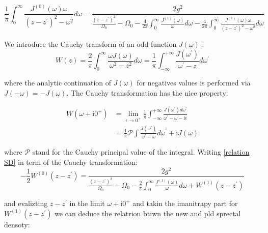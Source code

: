 \documentclass[%
preprint,
onecolumn,
notitlepag,
 amsmath,amssymb,
 aps,
 pra,
]{revtex4-2}
\begin{document}
\begin{itemize}
\begin{equation}
\frac{1}{\pi} \int_{0}^{\infty} \frac{J^{(0)}(\omega) \omega}{\left(z-z^{\prime}\right)^{2}-\omega^{2}} d \omega=\frac{2 g^{2}}{\frac{\left(z-z^{\prime}\right)^{2}}{\Omega_{0}}-\Omega_{0}-\frac{4}{2 \pi} \int_{0}^{\infty} \frac{J^{(1)}(\omega)}{\omega} d \omega-\frac{4}{2 \pi} \int_{0}^{\infty} \frac{J^{(1)}(\omega) \omega}{\left(z-z^{\prime}\right)^{2}-\omega^{2}} d \omega}
\label{relation SD}
\end{equation}

We introduce the Cauchy transform of an odd function $J(\omega)$ :
\begin{equation}
    W(z)=\frac{2}{\pi} \int_{0}^{\infty} \frac{\omega J(\omega)}{\omega^{2}-z^{2}} d \omega=\frac{1}{\pi} \int_{-\infty}^{+\infty} \frac{J\left(\omega^{\prime}\right)}{\omega^{\prime}-z} d \omega^{\prime}
\end{equation}


where the analytic continuation of $J(\omega)$ for negatives values is performed via $J(-\omega)=-J(\omega)$.  The Cauchy transformation has the nice property: 

\begin{equation}
\begin{aligned}
W\left(\omega+\mathrm{i} 0^{+}\right) &=\lim _{\epsilon \rightarrow 0^{+}} \frac{1}{\pi} \int_{-\infty}^{+\infty} \frac{J\left(\omega^{\prime}\right) d \omega^{\prime}}{\omega^{\prime}-\omega-\mathrm{i} \epsilon}\\
&=\frac{1}{\pi} \mathcal{P} \int \frac{J\left(\omega^{\prime}\right)}{\omega^{\prime}-\omega} d \omega^{\prime}+\mathrm{i} J(\omega)
\end{aligned}
\end{equation}

where $\mathcal{P}$ stand for the Cauchy principal value of the integral. Writing  \eqref{relation SD} in term of the  Cauchy transformation: 
\begin{equation}
\label{eq:J0toJ1}
-\frac{1}{2} W^{(0)}\left(z-z^{\prime}\right)=\frac{2 g^{2}}{\frac{\left(z-z^{\prime}\right)^{2}}{\Omega_{0}}-\Omega_{0}-\frac{2}{\pi} \int_{0}^{\infty} \frac{J^{(1)}(\omega)}{\omega} d \omega+W^{(1)}\left(z-z^{\prime}\right)}
\end{equation}

and evalizting $z-z^{\prime} $ in the limit $\omega+\mathrm{i} 0^{+}$ and takin the imanitrapy part for $W^{(1)}\left(z-z^{\prime}\right)$ we can deduce the relatrion btiwn the new and pld sprectal densoty: 



\end{itemize}
\end{document}
